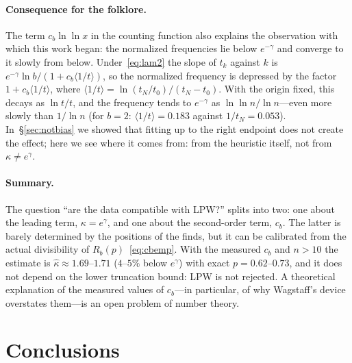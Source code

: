 \documentclass[11pt,a4paper]{article}
\theoremstyle{plain}
\theoremstyle{remark}
\newcommand{\Rb}{R_b}
\newcommand{\eg}{e^{\gamma}}
\newcommand{\emg}{e^{-\gamma}}
\begin{document}
\paragraph{Consequence for the folklore.} The term $c_b\ln\ln x$ in the counting
function also explains the observation with which this work began: the
normalized frequencies lie below $\emg$ and converge to it slowly from below.
Under~\eqref{eq:lam2} the slope of $t_k$ against $k$ is
$\emg\ln b/(1+c_b\langle1/t\rangle)$, so the normalized frequency is depressed by
the factor $1+c_b\langle1/t\rangle$, where
$\langle1/t\rangle=\ln(t_N/t_0)/(t_N-t_0)$. With the origin fixed, this decays as
$\ln t/t$, and the frequency tends to $\emg$ as $\ln\ln n/\ln n$---even more
slowly than $1/\ln n$ (for $b=2$: $\langle1/t\rangle=0.183$ against
$1/t_N=0.053$). In~\S\ref{sec:notbias} we showed that fitting up to
the right endpoint does not create the effect; here we see where it comes from:
from the heuristic itself, not from~$\kappa\ne\eg$.

\paragraph{Summary.} The question ``are the data compatible with LPW?'' splits
into two: one about the leading term, $\kappa=\eg$, and one about the
second-order term, $c_b$. The latter is barely determined by the positions of
the finds, but it can be calibrated from the actual divisibility of
$\Rb(p)$~\eqref{eq:cbemp}. With the measured $c_b$ and $n>10$ the estimate is
$\hat\kappa\approx1.69$--$1.71$ ($4$--$5\%$ below $\eg$) with exact
$p=0.62$--$0.73$, and it does not depend on the lower truncation bound: LPW is
not rejected. A theoretical explanation of the measured values of $c_b$---in
particular, of why Wagstaff's device overstates them---is an open problem of
number theory.

\section{Conclusions}
\end{document}

